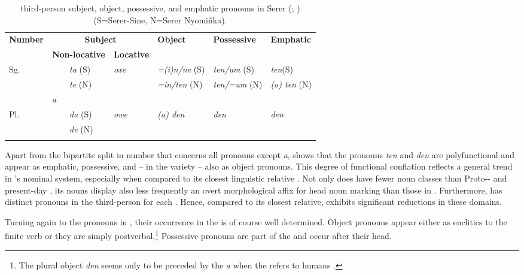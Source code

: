\documentclass[output=paper
,newtxmath
,modfonts
,nonflat]{langsci/langscibook}
\begin{document}
\begin{table}
\begin{tabularx}{\textwidth}{Xllllll}
\lsptoprule
\bfseries Number & \multicolumn{3}{c}{ \bfseries Subject} & \bfseries Object & \bfseries Possessive & \bfseries Emphatic \\
& \multicolumn{2}{l}{\bfseries Non-locative} & \multicolumn{1}{l}{\bfseries Locative} &  & \\
\midrule
\small Sg. & & \textit{ta} (S) & \textit{oxe} & \textit{=(i)n/ne} (S) &  \textit{ten/um} (S) & \textit{ten}(S) \normalsize \\
 	& & \textit{te} (N) &   & \textit{=in/ten} (N) &   \textit{ten/=um} (N) & \textit{(o) ten} (N) \\
 & \textit{a} & & & & & \\
Pl. &  & \textit{da} (S) &   \textit{owe} & \textit{(a) den} & \textit{den} & \textit{den} \\
 & & \textit{de} (N) & 	 &	 	\\
\lspbottomrule
\end{tabularx}
\normalsize
\caption{third-person subject, object, possessive, and emphatic pronouns in Serer (\citealt{Faye1979}; \citealt{Renaudier2012}) (S=Serer-Sine, N=Serer Nyomiñka).}
\label{tab:apel:1}
\end{table}



Apart from the bipartite split in number that concerns all pronouns except \textit{a},  shows that the pronouns \textit{ten} and \textit{den} are polyfunctional and appear as emphatic, possessive, and -- in the  variety -- also as object pronouns. This degree of functional conflation reflects a general trend in ’s nominal system, especially when compared to its closest linguistic relative . Not only does  have fewer noun classes than Proto-- and present-day  \citep{Merrill14}, its nouns display also less frequently an overt morphological affix for head noun marking than those in . Furthermore,  has distinct pronouns in the third-person for each . Hence, compared to its closest relative,  exhibits significant reductions in these domains. 

Turning again to the pronouns in , their occurrence in the  is of course well determined. Object pronouns appear either as enclitics to the finite verb or they are simply postverbal.\footnote{The plural object  \textit{den} seems only to be preceded by the  \textit{a} when the  refers to humans \citep[112-116]{Renaudier2012}.} Possessive pronouns are part of the  and occur after their head.
\end{document}
